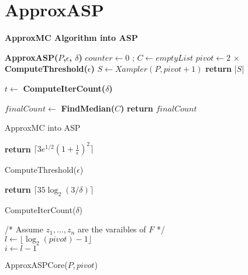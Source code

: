 \newpage
\section{ApproxASP}

\textbf{ApproxMC Algorithm into ASP}

\begin{algorithm}[H]
\textbf{ApproxASP($P$,$\epsilon$, $\delta$)} \;
\SetAlgoLined
{}
 $counter \gets 0$ ; $C \gets emptyList$\;
 $pivot \gets  2 \, \times $ \textbf{ComputeThreshold($\epsilon$)} \;
 $S \gets Xampler(P, pivot + 1)$   
 { %
 \textbf{return} |$S$|  
 } %
 { %
 $t \gets $ \textbf{ComputeIterCount($\delta$)} 
 
 } %
 $finalCount \gets $ \textbf{FindMedian($C$)} \;
 \textbf{return} $finalCount$
 
 \caption{ApproxMC into ASP}
\end{algorithm}


\begin{algorithm}[H]
\textbf{return} $\lceil 3 e^{1/2} (1 + \frac{1}{\epsilon})^2 \rceil$
\caption{ComputeThreshold($\epsilon$)}
\end{algorithm}

\begin{algorithm}[H]
\textbf{return} $\lceil 35 \log_2 (3/\delta) \rceil$
\caption{ComputeIterCount($\delta$)}
\end{algorithm}

\begin{algorithm}[H]
/* Assume $z_1 , ..., z_n $ are the varaibles of $F$ */ \\
$ l \gets \lfloor \log_2 (pivot) - 1 \rfloor$ \\
$ i \gets l - 1$ \\


\caption{ApproxASPCore($P, pivot$)}
\end{algorithm}
